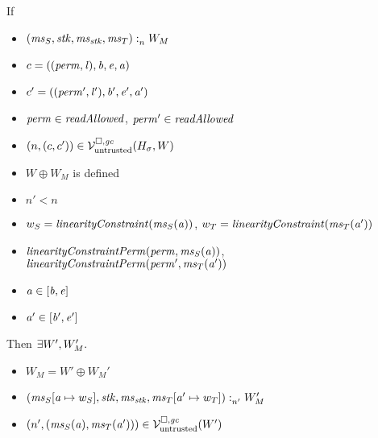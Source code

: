 \documentclass[a4paper]{article}
\begin{document}
\begin{lemma}
  \label{lem:readcond-cap-works}
  If
  \begin{itemize}
  \item $\memSat{(\ms_S,\stk,\ms_\stk,\ms_T)}{W_M}$
  \item $c = ((\perm,\lin),\baddr,\eaddr,\aaddr)$
  \item $c' = ((\perm',\lin'),\baddr',\eaddr',\aaddr')$
  \item $\perm \in \readAllowed{}$, $\perm' \in \readAllowed{}$
  \item $\npair{(c,c')}\in\lrv(H_\sigma,W)$
  \item $W \oplus W_M$ is defined
  \item $n' < n$
  \item $w_S = \linCons{\ms_S(\aaddr)}$, $w_T = \linCons{\ms_T(\aaddr')}$
  \item $\linConsPerm{\perm}{\ms_S(\aaddr)}$, $\linConsPerm{\perm'}{\ms_T(\aaddr')}$
  \item $\aaddr \in [\baddr,\eaddr]$
  \item $\aaddr' \in [\baddr',\eaddr']$
  \end{itemize}
  Then $\exists W', W_M'\ldotp$
  \begin{itemize}
  \item $W_M = W' \oplus W_M'$
  \item $\memSat[n']{(\ms_S\update{\aaddr}{w_S},\stk,\ms_\stk,\ms_T\update{\aaddr'}{w_T})}{W_M'}$
  \item $\npair[n']{(\ms_S(\aaddr),\ms_T(\aaddr'))} \in \lrv(W')$
  \end{itemize}
\end{lemma}
\end{document}
